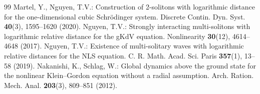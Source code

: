 \documentclass[10pt,a4paper]{amsart}
\numberwithin{equation}{section}
\begin{document}
\begin{thebibliography}{99}
 Martel, Y., Nguyen, T.V.: Construction of 2-solitons with logarithmic distance for the one-dimensional cubic Schr\"odinger system. Discrete Contin. Dyn. Syst. \textbf{40}(3), 1595--1620 (2020).
 Nguyen, T.V.: Strongly interacting multi-solitons with logarithmic relative distance for the gKdV equation. Nonlinearity \textbf{30}(12), 4614--4648 (2017).
 Nguyen, T.V.: Existence of multi-solitary waves with logarithmic relative distances for the NLS equation. C. R. Math. Acad. Sci. Paris \textbf{357}(1), 13--58 (2019).
 Nakanishi, K., Schlag, W.: Global dynamics above the ground state for the nonlinear Klein--Gordon equation without a radial assumption. Arch. Ration. Mech. Anal. \textbf{203}(3), 809--851 (2012).
\end{thebibliography}
\end{document}

